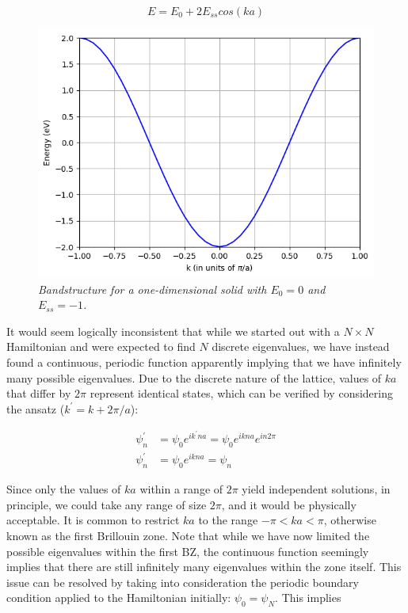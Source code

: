 \documentclass{resonance}
\begin{document}
\begin{equation}
    E = E_0 + 2E_{ss}cos(ka)
\end{equation}

\begin{figure}[!t]
\caption{\textit{Bandstructure for a one-dimensional solid with $E_0 = 0$ and $E_{ss} = -1$.}}\label{1d_chain}
\vspace{6pt}
\centering
\includegraphics[scale=0.5]{1d_chain.png}
\end{figure}

It would seem logically inconsistent that while we started out with a $N \times N$ Hamiltonian and were expected to find $N$ discrete eigenvalues, we have instead found a continuous, periodic function apparently implying that we have infinitely many possible eigenvalues. Due to the discrete nature of the lattice, values of $ka$ that differ by $2\pi$ represent identical states, which can be verified by considering the ansatz ($k^{'} = k + 2\pi/a$):

\begin{equation}
\begin{aligned}
    \psi_{n}^{'} &= \psi_{0}e^{ik^{'}na} = \psi_{0}e^{ikna}e^{in2\pi} \\
    \psi_{n}^{'} &= \psi_{0}e^{ikna} = \psi_{n}
\end{aligned}
\end{equation}

Since only the values of $ka$ within a range of $2\pi$ yield independent solutions, in principle, we could take any range of size $2\pi$, and it would be physically acceptable. It is common to restrict $ka$ to the range $-\pi < ka < \pi$, otherwise known as the first Brillouin zone. Note that while we have now limited the possible eigenvalues within the first BZ, the continuous function seemingly implies that there are still infinitely many eigenvalues within the zone itself. This issue can be resolved by taking into consideration the periodic boundary condition applied to the Hamiltonian initially: $\psi_{0} = \psi_{N}$. This implies
\end{document}
